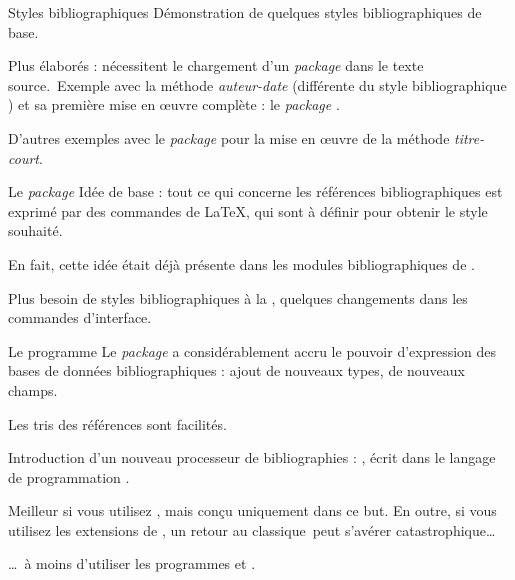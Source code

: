 \documentclass[pdf]{beamer}
\newcommand{\pgbiber}{\pgname{biber}}
\begin{document}
\begin{frame}{Styles bibliographiques}
Démonstration de quelques styles bibliographiques de base.\pause

Plus élaborés : nécessitent le chargement d'un
\foreignlanguage{english}{\emph{package}} dans le texte source.\pause\ Exemple
avec la méthode \emph{auteur-date} (différente du style bibliographique
\foreignlanguage{english}{}) et sa première mise
en œuvre complète : le \foreignlanguage{english}{\emph{package}
}.\pause

D'autres exemples avec le \foreignlanguage{english}{\emph{package}
} pour la mise en œuvre de la méthode \emph{titre-court}.
\end{frame}

\begin{frame}{Le \foreignlanguage{english}{\emph{package}
}}
Idée de base : tout ce qui concerne les références bibliographiques est exprimé
par des commandes de \LaTeX, qui sont à définir pour obtenir le style
souhaité.\pause

En fait, cette idée était déjà présente dans les modules bibliographiques de
\foreignlanguage{english}{\ConTeXt}.\pause

Plus besoin de styles bibliographiques à la \foreignlanguage{english}{\BibTeX},
quelques changements dans les commandes d'interface.
\end{frame}

\begin{frame}{Le programme \foreignlanguage{english}{\pgbiber}}
Le \foreignlanguage{english}{\emph{package} } a
considérablement accru le pouvoir d'expression des bases de données
bibliographiques : ajout de nouveaux types, de nouveaux champs.\pause

Les tris des références sont facilités.\pause

Introduction d'un nouveau processeur de bibliographies :
\foreignlanguage{english}{\pgbiber}, écrit dans le langage de programmation
\foreignlanguage{english}{\pgPerl}.\pause

Meilleur si vous utilisez \foreignlanguage{english}{},
mais conçu uniquement dans ce but. En outre, si vous utilisez les extensions de
\foreignlanguage{english}{}, un retour au \og
\foreignlanguage{english}{\BibTeX} classique\fg\ peut s'avérer
catastrophique\ldots\pause

\ldots\ à moins d'utiliser les programmes
\foreignlanguage{english}{} et
\foreignlanguage{english}{}.
\end{frame}
\end{document}
